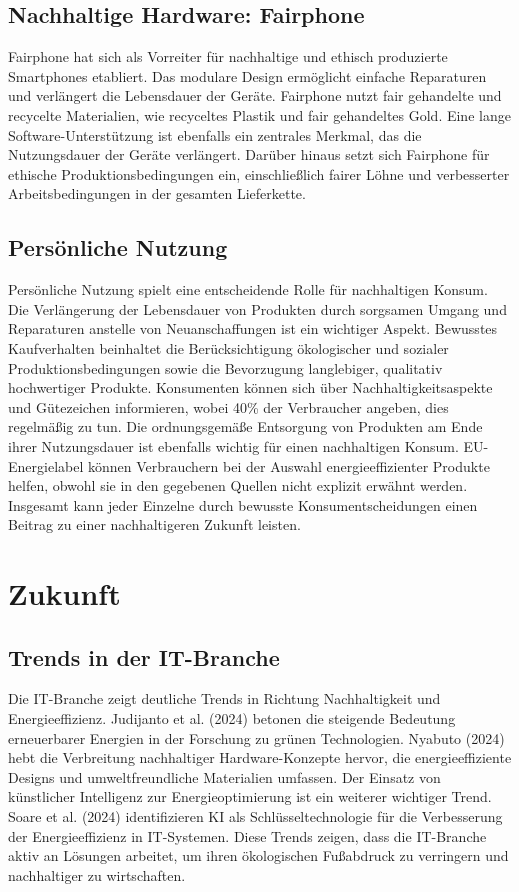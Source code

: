 \documentclass[12pt]{article}
\begin{document}
\subsection{Nachhaltige Hardware: Fairphone}
Fairphone hat sich als Vorreiter für nachhaltige und ethisch produzierte Smartphones etabliert. Das modulare Design ermöglicht einfache Reparaturen und verlängert die Lebensdauer der Geräte\cite{fairphoneimpact}. Fairphone nutzt fair gehandelte und recycelte Materialien, wie recyceltes Plastik und fair gehandeltes Gold\cite{fairphoneimpact}. Eine lange Software-Unterstützung ist ebenfalls ein zentrales Merkmal, das die Nutzungsdauer der Geräte verlängert\cite{fairphoneimpact}. Darüber hinaus setzt sich Fairphone für ethische Produktionsbedingungen ein, einschließlich fairer Löhne und verbesserter Arbeitsbedingungen in der gesamten Lieferkette\cite{fairphoneimpact}.


\subsection{Persönliche Nutzung}
Persönliche Nutzung spielt eine entscheidende Rolle für nachhaltigen Konsum. Die Verlängerung der Lebensdauer von Produkten durch sorgsamen Umgang und Reparaturen anstelle von Neuanschaffungen ist ein wichtiger Aspekt. Bewusstes Kaufverhalten beinhaltet die Berücksichtigung ökologischer und sozialer Produktionsbedingungen sowie die Bevorzugung langlebiger, qualitativ hochwertiger Produkte. Konsumenten können sich über Nachhaltigkeitsaspekte und Gütezeichen informieren, wobei 40\% der Verbraucher angeben, dies regelmäßig zu tun. Die ordnungsgemäße Entsorgung von Produkten am Ende ihrer Nutzungsdauer ist ebenfalls wichtig für einen nachhaltigen Konsum. EU-Energielabel können Verbrauchern bei der Auswahl energieeffizienter Produkte helfen, obwohl sie in den gegebenen Quellen nicht explizit erwähnt werden. Insgesamt kann jeder Einzelne durch bewusste Konsumentscheidungen einen Beitrag zu einer nachhaltigeren Zukunft leisten\cite{buerger2022}.

\section{Zukunft}
\subsection{Trends in der IT-Branche}
Die IT-Branche zeigt deutliche Trends in Richtung Nachhaltigkeit und Energieeffizienz. Judijanto et al. (2024) betonen die steigende Bedeutung erneuerbarer Energien in der Forschung zu grünen Technologien\cite{judijanto2024}. Nyabuto (2024) hebt die Verbreitung nachhaltiger Hardware-Konzepte hervor, die energieeffiziente Designs und umweltfreundliche Materialien umfassen\cite{nyabuto2024}.
Der Einsatz von künstlicher Intelligenz zur Energieoptimierung ist ein weiterer wichtiger Trend. Soare et al. (2024) identifizieren KI als Schlüsseltechnologie für die Verbesserung der Energieeffizienz in IT-Systemen\cite{soare2024}. Diese Trends zeigen, dass die IT-Branche aktiv an Lösungen arbeitet, um ihren ökologischen Fußabdruck zu verringern und nachhaltiger zu wirtschaften.
\end{document}
